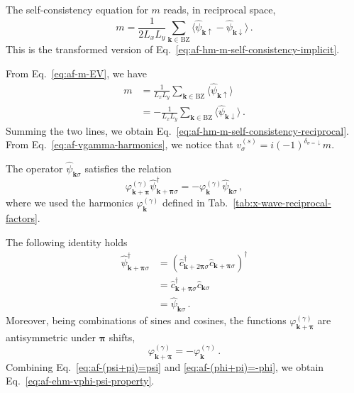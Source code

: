 The self-consistency equation for $m$ reads, in reciprocal space, 
\begin{equation}\label{eq:af-hm-m-self-consistency-reciprocal}
	m = \frac{1}{2L_xL_y} \sum_{\mathbf{k}\in\mathrm{BZ}} \langle \hat \psi_{\mathbf{k}\uparrow} - \hat \psi_{\mathbf{k}\downarrow} \rangle \, . 
\end{equation}
This is the transformed version of Eq.~\eqref{eq:af-hm-m-self-consistency-implicit}.

\begin{tabproof}	
	
	From Eq.~\eqref{eq:af-m-EV}, we have
	\begin{align}
		m &= \frac{1}{L_xL_y} \sum_{\mathbf{k}\in\mathrm{BZ}} \langle \hat \psi_{\mathbf{k}\uparrow} \rangle \label{eq:af-m-EV-up}\\
		&= -\frac{1}{L_xL_y} \sum_{\mathbf{k}\in\mathrm{BZ}} \langle \hat \psi_{\mathbf{k}\downarrow} \rangle \, . \label{eq:af-m-EV-down}
	\end{align}
	Summing the two lines, we obtain Eq.~\eqref{eq:af-hm-m-self-consistency-reciprocal}. From Eq.~\eqref{eq:af-vgamma-harmonics}, we notice that $v_\sigma^{(s)} = i (-1)^{\delta_{\sigma=\downarrow}} m$.
	
\end{tabproof}

The operator $\hat \psi_{\mathbf{k}\sigma}$ satisfies the relation
\begin{equation}\label{eq:af-ehm-vphi-psi-property}
	\varphi_{\mathbf{k}+\bm{\pi}}^{(\gamma)} \hat \psi_{\mathbf{k}+\bm{\pi}\sigma}^\dagger = - \varphi_\mathbf{k}^{(\gamma)} \hat \psi_{\mathbf{k}\sigma} \, ,
\end{equation}
where we used the harmonics $\varphi_\mathbf{k}^{(\gamma)}$ defined in Tab.~\ref{tab:x-wave-reciprocal-factors}. 

\begin{tabproof}
	The following identity holds
	\begin{align}
		\hat \psi_{\mathbf{k}+\bm{\pi}\sigma}^\dagger &= \left(
		\hat c_{\mathbf{k}+2\bm{\pi}\sigma}^\dagger \hat c_{\mathbf{k}+\bm{\pi}\sigma}
		\right)^\dagger \nonumber \\
		&= \hat c_{\mathbf{k}+\bm{\pi}\sigma}^\dagger \hat c_{\mathbf{k}\sigma} \nonumber \\
		&= \hat \psi_{\mathbf{k}\sigma} \, . \label{eq:af-(psi+pi)=psi}
	\end{align}
	Moreover, being combinations of sines and cosines, the functions $\varphi_{\mathbf{k}+\bm{\pi}}^{(\gamma)}$ are antisymmetric under $\bm{\pi}$ shifts,
	\begin{equation}\label{eq:af-(phi+pi)=-phi}
		\varphi_{\mathbf{k}+\bm{\pi}}^{(\gamma)} = -\varphi_\mathbf{k}^{(\gamma)} \, .
	\end{equation}
	Combining Eq.~\eqref{eq:af-(psi+pi)=psi} and \eqref{eq:af-(phi+pi)=-phi}, we obtain Eq.~\eqref{eq:af-ehm-vphi-psi-property}.
\end{tabproof}

